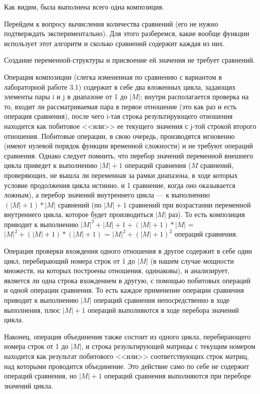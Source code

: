 \documentclass[12pt]{article}
\begin{document}
	Как видим, была выполнена всего одна композиция. 
	
	Перейдем к вопросу вычисления количества сравнений (его не нужно подтверждать экспериментально). Для этого разберемся, какие вообще функции использует этот алгоритм и сколько сравнений содержит каждая из них. 
	
	Создание переменной-структуры и присвоение ей значения не требует сравнений. 
	
	Операция композиции (слегка измененная по сравнению с вариантом в лабораторной работе 3.1) содержит в себе два вложенных цикла, задающих элементы пары i и j в диапазоне от 1 до $|M|$; внутри располагается проверка на то, входит ли рассматриваемая пара в первое отношение (это как раз и есть операция сравнения), после чего i-тая строка результирующего отношения находится как побитовое <<или>> ее текущего значения с j-той строкой второго отношения. Побитовые операции, в свою очередь, производятся мгновенно (имеют нулевой порядок функции временной сложности) и не требуют операций сравнения. Однако следует помнить, что перебор значений переменной внешнего цикла приведет к выполнению $|M|+1$ операций сравнения ($M$ сравнений, проверяющих, не вышла ли переменная за рамки диапазона, в ходе которых условие продолжения цикла истинно, и 1 сравнение, когда оно оказывается ложным), а перебор значений внутреннего цикла --- к выполнению $(|M|+1)*|M|$ сравнений (по $|M|+1$ сравнений при возрастании переменной внутреннего цикла, которое будет производиться $|M|$ раз). То есть композиция приводит к выполнению $|M|^2 + |M|+1 + (|M|+1)*|M|$ = $|M|^2 + (|M|+1)*(|M|+1)$ = $|M|^2 + (|M|+1)^2$ операций сравнения. 
	
	Операция проверки вхождения одного отношения в другое содержит в себе один цикл, перебирающий номера строк от 1 до $|M|$ (в нашем случае мощности множеств, на которых построены отношения, одинаковы), и анализирует, является ли одна строка вхождением в другую, с помощью побитовых операций и одной операции сравнения. То есть каждое применение операции сравнения приводит к выполнению $|M|$ операций сравнения непосредственно в ходе выполнения, плюс $|M| + 1$ операций выполняются в ходе перебора значений цикла. 
	
	Наконец, операция объединения также состоит из одного цикла, перебирающего номера строк от 1 до $|M|$, и строка результирующей матрицы с текущим номером находится как результат побитового <<или>> соответствующих строк матриц, над которыми проводится объединение. Это действие само по себе не содержит операций сравнения, но $|M|+1$ операций сравнения выполняются при переборе значений цикла.
	
\end{document}
